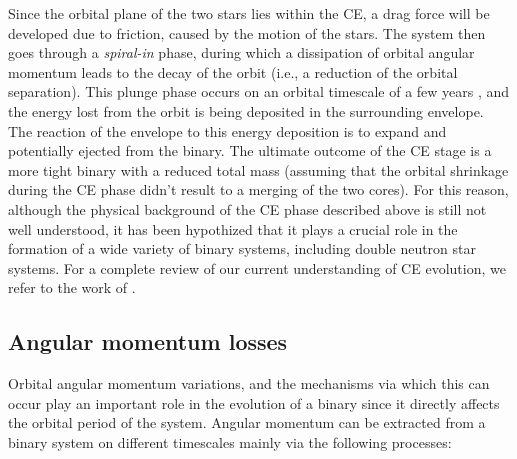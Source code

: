 \documentclass[../../main/thesis_msc.tex]{subfiles}
\begin{document}
				Since the orbital plane of the two stars lies within the CE, a drag force will be developed due to friction, caused by the motion of the stars. The system then goes through a \emph{spiral-in} phase, during which a dissipation of orbital angular momentum leads to the decay of the orbit (i.e., a reduction of the orbital separation). This plunge phase occurs on an orbital timescale of a few years \citep{Izzard_CE}, and the energy lost from the orbit is being deposited in the surrounding envelope. The reaction of the envelope to this energy deposition is to expand and potentially ejected from the binary. The ultimate outcome of the CE stage is a more tight binary with a reduced total mass (assuming that the orbital shrinkage during the CE phase didn't result to a merging of the two cores). For this reason, although the physical background of the CE phase described above is still not well understood, it has been hypothized that it plays a crucial role in the formation of a wide variety of binary systems, including double neutron star systems. For a complete review of our current understanding of CE evolution, we refer to the work of \cite{Ivanova_CE}.
				
			\subsection{Angular momentum losses}
			
				Orbital angular momentum variations, and the mechanisms via which this can occur play an important role in the evolution of a binary since it directly affects the orbital period of the system. Angular momentum can be extracted from a binary system on different timescales \citep{Yakut2008} mainly via the following processes:
				
\end{document}

